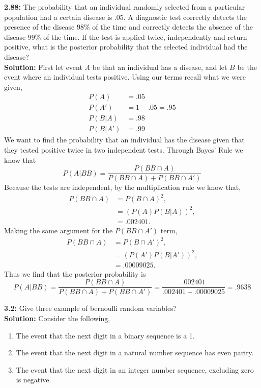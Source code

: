 \documentclass[12pt]{article}
\theoremstyle{homework}
\begin{document}
\textbf{2.88:} The probability that an individual randomly selected from a particular population had a certain disease is $.05$.
A diagnostic test correctly detects the presence of the disease $98\%$ of the time and correctly detects the absence of the disease $99\%$
of the time. If the test is applied twice, independently and return positive, what is the posterior probability that the selected individual had the disease?\\

\textbf{Solution:} First let event $A$ be that an individual has a disease, and let $B$ be the event where an individual tests positive. Using our terms recall what we were given,
\begin{align*}
  P(A) &= .05\\
  P(A') &= 1 - .05 = .95\\
  P(B|A) &= .98\\
  P(B|A') &= .99
\end{align*}
We want to find the probability that an individual has the disease given that they tested positive twice in two independent tests. Through Bayes' Rule we know that
\begin{equation*}
  P(A|BB) = \dfrac{P(BB\cap A)}{P(BB\cap A)+P(BB\cap A')}
\end{equation*} 
Because the tests are independent, by the multiplication rule we know that,
\begin{align*}
  P(BB\cap A) &= P(B \cap A)^2,\\
  &= (P(A)P(B|A))^2,\\
  &=.002401.
\end{align*}
Making the same argument for the  $P(BB\cap A')$ term, 
\begin{align*}
  P(BB\cap A) &= P(B \cap A')^2,\\
  &= (P(A')P(B|A'))^2,\\
  &=.00009025.
\end{align*}
Thus we find that the posterior probability is
\begin{equation*}
  P(A|BB) =\dfrac{P(BB\cap A)}{P(BB\cap A)+P(BB\cap A')} = \dfrac{.002401}{.002401 + .00009025} =.9638
\end{equation*}
\vspace{1in}




\textbf{3.2:} Give three example of bernoulli random variables?\\

\textbf{Solution:} Consider the following,
\begin{enumerate}
  \item The event that the next digit in a binary sequence is a 1.
  \item The event that the next digit in a natural number sequence has even parity.
  \item The event that the next digit in an integer number sequence, excluding zero is negative.
\end{enumerate}
\vspace{1in}
\end{document}
